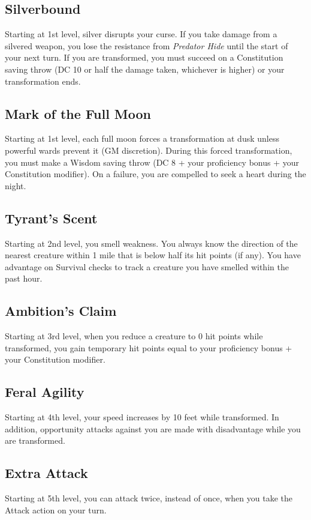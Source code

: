 \documentclass{apotheosis-book}
\begin{document}
\subsection*{Silverbound}
Starting at 1st level, silver disrupts your curse. If you take damage from a silvered weapon, you lose the resistance from \emph{Predator Hide} until the start of your next turn. If you are transformed, you must succeed on a Constitution saving throw (DC 10 or half the damage taken, whichever is higher) or your transformation ends.

\subsection*{Mark of the Full Moon}
Starting at 1st level, each full moon forces a transformation at dusk unless powerful wards prevent it (GM discretion). During this forced transformation, you must make a Wisdom saving throw (DC 8 + your proficiency bonus + your Constitution modifier). On a failure, you are compelled to seek a heart during the night.

\subsection*{Tyrant's Scent}
Starting at 2nd level, you smell weakness. You always know the direction of the nearest creature within 1 mile that is below half its hit points (if any). You have advantage on Survival checks to track a creature you have smelled within the past hour.

\subsection*{Ambition's Claim}
Starting at 3rd level, when you reduce a creature to 0 hit points while transformed, you gain temporary hit points equal to your proficiency bonus + your Constitution modifier.

\subsection*{Feral Agility}
Starting at 4th level, your speed increases by 10 feet while transformed. In addition, opportunity attacks against you are made with disadvantage while you are transformed.

\subsection*{Extra Attack}
Starting at 5th level, you can attack twice, instead of once, when you take the Attack action on your turn.
\end{document}
